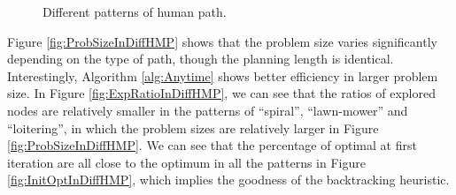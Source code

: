 \begin{figure} 
  \centering 
  \caption{Different patterns of human path.} 
  \label{fig:diffHMP}
\end{figure}

Figure \ref{fig:ProbSizeInDiffHMP} shows that the problem size varies significantly depending on the type of path, though the planning length is identical.
Interestingly, Algorithm \ref{alg:Anytime} shows better efficiency in larger problem size.
In Figure \ref{fig:ExpRatioInDiffHMP}, we can see that the ratios of explored nodes are relatively smaller in the patterns of ``spiral'', ``lawn-mower'' and ``loitering'', in which the problem sizes are relatively larger in Figure \ref{fig:ProbSizeInDiffHMP}.
We can see that the percentage of optimal at first iteration are all close to the optimum in all the patterns in Figure \ref{fig:InitOptInDiffHMP}, which implies the goodness of the backtracking heuristic.

